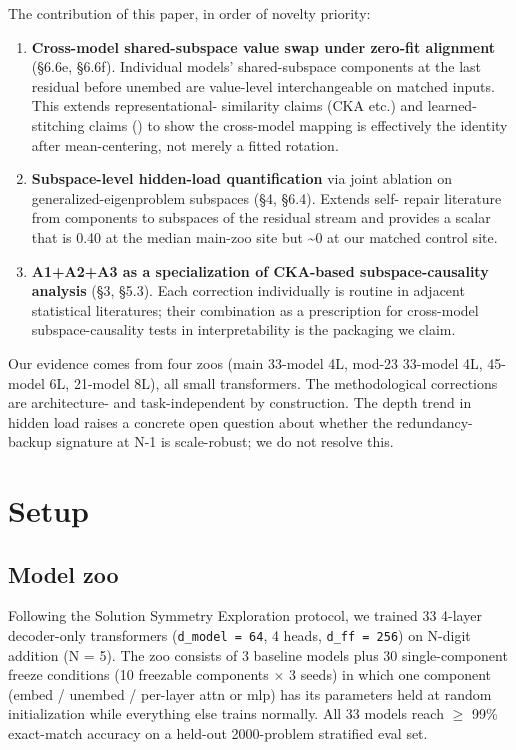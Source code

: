The contribution of this paper, in order of novelty priority:

\begin{enumerate}
  \item \textbf{Cross-model shared-subspace value swap under zero-fit alignment} (\S{}6.6e, \S{}6.6f). Individual models' shared-subspace components at the last residual before unembed are value-level interchangeable on matched inputs. This extends representational- similarity claims (CKA etc.) and learned-stitching claims (\citep{bansal2021stitching}) to show the cross-model mapping is effectively the identity after mean-centering, not merely a fitted rotation.
  \item \textbf{Subspace-level hidden-load quantification} via joint ablation on generalized-eigenproblem subspaces (\S{}4, \S{}6.4). Extends self- repair literature from components to subspaces of the residual stream and provides a scalar that is 0.40 at the median main-zoo site but \textasciitilde{}0 at our matched control site.
  \item \textbf{A1+A2+A3 as a specialization of CKA-based subspace-causality analysis} (\S{}3, \S{}5.3). Each correction individually is routine in adjacent statistical literatures; their combination as a prescription for cross-model subspace-causality tests in interpretability is the packaging we claim.
\end{enumerate}

Our evidence comes from four zoos (main 33-model 4L, mod-23 33-model
4L, 45-model 6L, 21-model 8L), all small transformers. The
methodological corrections are architecture- and task-independent by
construction. The depth trend in hidden load raises a concrete open
question about whether the redundancy-backup signature at N-1 is
scale-robust; we do not resolve this.


\section{Setup}

\subsection{Model zoo}

Following the Solution Symmetry Exploration protocol, we trained 33
4-layer decoder-only transformers (\texttt{d\_model = 64}, 4 heads, \texttt{d\_ff = 256})
on N-digit addition (N = 5). The zoo consists of 3 baseline models plus
30 single-component freeze conditions (10 freezable components $\times$ 3 seeds)
in which one component (embed / unembed / per-layer attn or mlp) has its
parameters held at random initialization while everything else trains
normally. All 33 models reach $\geq$ 99\% exact-match accuracy on a held-out
2000-problem stratified eval set.

